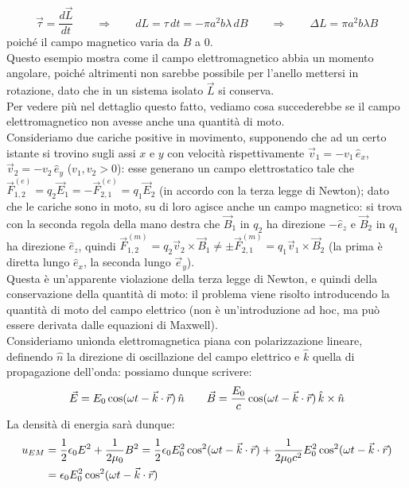 \begin{equation}
	\vec{\tau} = \frac{d\vec{L}}{dt} \qquad\Longrightarrow\qquad dL = \tau \,dt = -\pi a^2 b \lambda \,dB \qquad\Longrightarrow\qquad \Delta L = \pi a^2 b \lambda B
	\label{eq:38}
\end{equation}
poiché il campo magnetico varia da $ B $ a $ 0 $. \\ 
%
Questo esempio mostra come il campo elettromagnetico abbia un momento angolare, poiché altrimenti non sarebbe possibile per l'anello mettersi in rotazione, dato che in un sistema isolato $ \vec{L} $ si conserva. \\ 
Per vedere più nel dettaglio questo fatto, vediamo cosa succederebbe se il campo elettromagnetico non avesse anche una quantità di moto. \\ 
Consideriamo due cariche positive in movimento, supponendo che ad un certo istante si trovino sugli assi $ x $ e $ y $ con velocità rispettivamente $ \vec{v}_1 = - v_1 \,\hat{e}_x $, $ \vec{v}_2 = - v_2 \,\hat{e}_y $ ($ v_1, v_2 > 0 $): esse generano un campo elettrostatico tale che $ \vec{F}^{(e)}_{1,2} = q_2 \vec{E}_1 = - \vec{F}^{(e)}_{2,1} = q_1 \vec{E}_2 $ (in accordo con la terza legge di Newton); dato che le cariche sono in moto, su di loro agisce anche un campo magnetico: si trova con la seconda regola della mano destra che $ \vec{B}_1 $ in $ q_2 $ ha direzione $ -\hat{e}_z $ e $ \vec{B}_2 $ in $ q_1 $ ha direzione $ \hat{e}_z $, quindi $ \vec{F}^{(m)}_{1,2} = q_2 \vec{v}_2 \times \vec{B}_1 \neq \pm \vec{F}^{(m)}_{2,1} = q_1 \vec{v}_1 \times \vec{B}_2 $ (la prima è diretta lungo $ \hat{e}_x $, la seconda lungo $ \vec{e}_y $). \\ 
%
Questa è un'apparente violazione della terza legge di Newton, e quindi della conservazione della quantità di moto: il problema viene risolto introducendo la quantità di moto del campo elettrico (non è un'introduzione ad hoc, ma può essere derivata dalle equazioni di Maxwell). \\ 
Consideriamo unìonda elettromagnetica piana con polarizzazione lineare, definendo $ \hat{n} $ la direzione di oscillazione del campo elettrico e $ \hat{k} $ quella di propagazione dell'onda: possiamo dunque scrivere:
\begin{equation}
	\vec{E} = E_0 \cos(\omega t - \vec{k}\cdot\vec{r}) \,\hat{n} \qquad \vec{B} = \frac{E_0}{c} \cos(\omega t - \vec{k}\cdot\vec{r}) \,\hat{k}\times\hat{n}
	\label{eq:39}
\end{equation}
La densità di energia sarà dunque:
\begin{equation}
	\begin{split}
		u_{EM} &= \frac{1}{2} \epsilon_0 E^2 + \frac{1}{2\mu_0} B^2 = \frac{1}{2} \epsilon_0 E_0^2 \cos^2 (\omega t - \vec{k}\cdot\vec{r}) + \frac{1}{2\mu_0 c^2} E_0^2 \cos^2 (\omega t - \vec{k}\cdot\vec{r}) \\ 
		       &= \epsilon_0 E_0^2 \cos^2 (\omega t - \vec{k}\cdot\vec{r})
	\end{split}
	\label{eq:40}
\end{equation}
